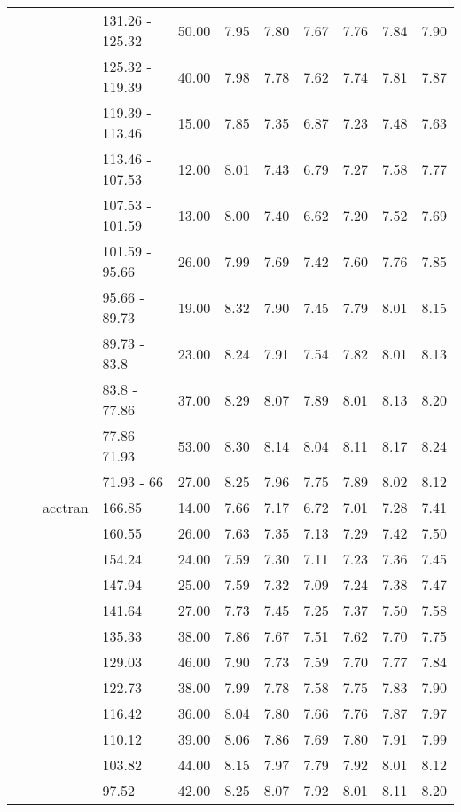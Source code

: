 \begin{longtable}{llllrrrrrrr}
   &  &  & 131.26 - 125.32 & 50.00 & 7.95 & 7.80 & 7.67 & 7.76 & 7.84 & 7.90 \\ 
   &  &  & 125.32 - 119.39 & 40.00 & 7.98 & 7.78 & 7.62 & 7.74 & 7.81 & 7.87 \\ 
   &  &  & 119.39 - 113.46 & 15.00 & 7.85 & 7.35 & 6.87 & 7.23 & 7.48 & 7.63 \\ 
   &  &  & 113.46 - 107.53 & 12.00 & 8.01 & 7.43 & 6.79 & 7.27 & 7.58 & 7.77 \\ 
   &  &  & 107.53 - 101.59 & 13.00 & 8.00 & 7.40 & 6.62 & 7.20 & 7.52 & 7.69 \\ 
   &  &  & 101.59 - 95.66 & 26.00 & 7.99 & 7.69 & 7.42 & 7.60 & 7.76 & 7.85 \\ 
   &  &  & 95.66 - 89.73 & 19.00 & 8.32 & 7.90 & 7.45 & 7.79 & 8.01 & 8.15 \\ 
   &  &  & 89.73 - 83.8 & 23.00 & 8.24 & 7.91 & 7.54 & 7.82 & 8.01 & 8.13 \\ 
   &  &  & 83.8 - 77.86 & 37.00 & 8.29 & 8.07 & 7.89 & 8.01 & 8.13 & 8.20 \\ 
   &  &  & 77.86 - 71.93 & 53.00 & 8.30 & 8.14 & 8.04 & 8.11 & 8.17 & 8.24 \\ 
   &  &  & 71.93 - 66 & 27.00 & 8.25 & 7.96 & 7.75 & 7.89 & 8.02 & 8.12 \\ 
   &  & acctran & 166.85 & 14.00 & 7.66 & 7.17 & 6.72 & 7.01 & 7.28 & 7.41 \\ 
   &  &  & 160.55 & 26.00 & 7.63 & 7.35 & 7.13 & 7.29 & 7.42 & 7.50 \\ 
   &  &  & 154.24 & 24.00 & 7.59 & 7.30 & 7.11 & 7.23 & 7.36 & 7.45 \\ 
   &  &  & 147.94 & 25.00 & 7.59 & 7.32 & 7.09 & 7.24 & 7.38 & 7.47 \\ 
   &  &  & 141.64 & 27.00 & 7.73 & 7.45 & 7.25 & 7.37 & 7.50 & 7.58 \\ 
   &  &  & 135.33 & 38.00 & 7.86 & 7.67 & 7.51 & 7.62 & 7.70 & 7.75 \\ 
   &  &  & 129.03 & 46.00 & 7.90 & 7.73 & 7.59 & 7.70 & 7.77 & 7.84 \\ 
   &  &  & 122.73 & 38.00 & 7.99 & 7.78 & 7.58 & 7.75 & 7.83 & 7.90 \\ 
   &  &  & 116.42 & 36.00 & 8.04 & 7.80 & 7.66 & 7.76 & 7.87 & 7.97 \\ 
   &  &  & 110.12 & 39.00 & 8.06 & 7.86 & 7.69 & 7.80 & 7.91 & 7.99 \\ 
   &  &  & 103.82 & 44.00 & 8.15 & 7.97 & 7.79 & 7.92 & 8.01 & 8.12 \\ 
   &  &  & 97.52 & 42.00 & 8.25 & 8.07 & 7.92 & 8.01 & 8.11 & 8.20 \\ 

\end{longtable}
